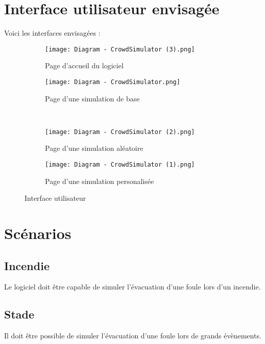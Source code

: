 \documentclass{article}
\begin{document}
\section{Interface utilisateur envisagée}
     Voici les interfaces envisagées :
    \begin{figure}[ht!]
        \begin{subfigure}{0.5\textwidth}
            \texttt{[image: Diagram - CrowdSimulator (3).png]}
            \caption{Page d'accueil du logiciel \label{fig : PageAccueil}}
        \end{subfigure}
        \begin{subfigure}{0.5\textwidth}
            \texttt{[image: Diagram - CrowdSimulator.png]}
            \caption{Page d'une simulation de base \label{fig : SimulationBase}}
        \end{subfigure}\\
        \begin{subfigure}{0.5\textwidth}
            \texttt{[image: Diagram - CrowdSimulator (2).png]}
            \caption{Page d'une simulation aléatoire \label{fig : SimulationAléatoire}}
        \end{subfigure}
        \begin{subfigure}{0.5\textwidth}
            \texttt{[image: Diagram - CrowdSimulator (1).png]}
            \caption{Page d'une simulation personalisée \label{fig : SimulationPerso}}
        \end{subfigure}
        \caption{Interface utilisateur \label{fig : Interface}}
    \end{figure}

\section{Scénarios}
    \subsection{Incendie}
    Le logiciel doit être capable de simuler l'évacuation d'une foule lors d'un incendie.
    
    \subsection{Stade}
    Il doit être possible de simuler l'évacuation d'une foule lors de grands évènements.
    
\end{document}
